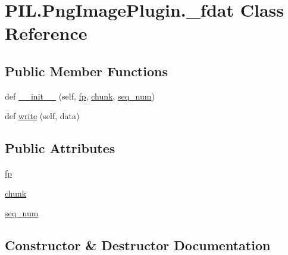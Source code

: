 \hypertarget{classPIL_1_1PngImagePlugin_1_1__fdat}{}\section{P\+I\+L.\+Png\+Image\+Plugin.\+\_\+fdat Class Reference}
\label{classPIL_1_1PngImagePlugin_1_1__fdat}
\subsection*{Public Member Functions}
\begin{DoxyCompactItemize}
\item 
def \hyperlink{classPIL_1_1PngImagePlugin_1_1__fdat_a6f7979a69b4d74640984d965074a3918}{\+\_\+\+\_\+init\+\_\+\+\_\+} (self, \hyperlink{classPIL_1_1PngImagePlugin_1_1__fdat_a5cbd24dfe38eac8a60b4341a03d814c3}{fp}, \hyperlink{classPIL_1_1PngImagePlugin_1_1__fdat_a2be3061c08bf6a177d0c5c6f6c206898}{chunk}, \hyperlink{classPIL_1_1PngImagePlugin_1_1__fdat_a1bc249f3acdcc0bf08677dda60a2623f}{seq\+\_\+num})
\item 
def \hyperlink{classPIL_1_1PngImagePlugin_1_1__fdat_af817196d3b11e6cdc471b36207683798}{write} (self, data)
\end{DoxyCompactItemize}
\subsection*{Public Attributes}
\begin{DoxyCompactItemize}
\item 
\hyperlink{classPIL_1_1PngImagePlugin_1_1__fdat_a5cbd24dfe38eac8a60b4341a03d814c3}{fp}
\item 
\hyperlink{classPIL_1_1PngImagePlugin_1_1__fdat_a2be3061c08bf6a177d0c5c6f6c206898}{chunk}
\item 
\hyperlink{classPIL_1_1PngImagePlugin_1_1__fdat_a1bc249f3acdcc0bf08677dda60a2623f}{seq\+\_\+num}
\end{DoxyCompactItemize}


\subsection{Constructor \& Destructor Documentation}
\mbox{\label{classPIL_1_1PngImagePlugin_1_1__fdat_a6f7979a69b4d74640984d965074a3918}} 
